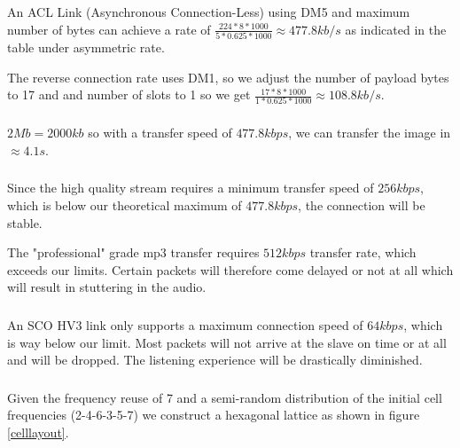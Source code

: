 \documentclass[12pt]{article}
\newcommand{\multipartexercise}{\addtocounter{subsection}{1}\setcounter{subsubsection}{0}}
\newcommand{\exercisepart}{\subsubsection{}}
\begin{document}
An ACL Link (Asynchronous Connection-Less) using DM5 and maximum number of bytes can achieve a rate of $\frac{224*8*1000}{5*0.625*1000} \approx 477.8kb/s$ as indicated in the table under asymmetric rate.

The reverse connection rate uses DM1, so we adjust the number of payload bytes to 17 and and number of slots to 1 so we get $\frac{17*8*1000}{1*0.625*1000} \approx 108.8kb/s$.

\exercisepart
$2Mb=2000kb$ so with a transfer speed of $477.8kbps$, we can transfer the image in $\approx4.1s$.

\exercisepart
Since the high quality stream requires a minimum transfer speed of $256kbps$, which is below our theoretical maximum of $477.8kbps$, the connection will be stable.

The "professional" grade mp3 transfer requires $512kbps$ transfer rate, which exceeds our limits. Certain packets will therefore come delayed or not at all which will result in stuttering in the audio.

\exercisepart
An SCO HV3 link only supports a maximum connection speed of $64kbps$, which is way below our limit. Most packets will not arrive at the slave on time or at all and will be dropped. The listening experience will be drastically diminished.

\multipartexercise
\exercisepart
Given the frequency reuse of 7 and a semi-random distribution of the initial cell frequencies (2-4-6-3-5-7) we construct a hexagonal lattice as shown in figure \ref{celllayout}.
\end{document}
